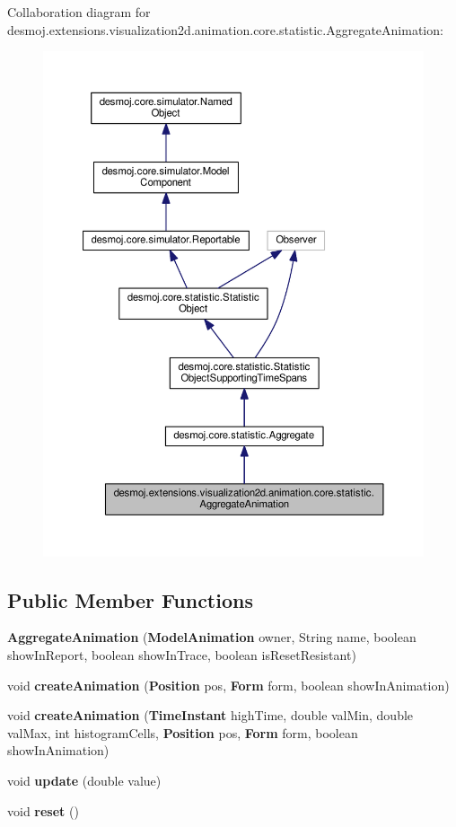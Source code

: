 Collaboration diagram for desmoj.\-extensions.\-visualization2d.\-animation.\-core.\-statistic.\-Aggregate\-Animation\-:
\nopagebreak
\begin{figure}[H]
\begin{center}
\leavevmode
\includegraphics[width=350pt]{classdesmoj_1_1extensions_1_1visualization2d_1_1animation_1_1core_1_1statistic_1_1_aggregate_animation__coll__graph}
\end{center}
\end{figure}
\subsection*{Public Member Functions}
\begin{DoxyCompactItemize}
\item 
{\bf Aggregate\-Animation} ({\bf Model\-Animation} owner, String name, boolean show\-In\-Report, boolean show\-In\-Trace, boolean is\-Reset\-Resistant)
\item 
void {\bf create\-Animation} ({\bf Position} pos, {\bf Form} form, boolean show\-In\-Animation)
\item 
void {\bf create\-Animation} ({\bf Time\-Instant} high\-Time, double val\-Min, double val\-Max, int histogram\-Cells, {\bf Position} pos, {\bf Form} form, boolean show\-In\-Animation)
\item 
void {\bf update} (double value)
\item 
void {\bfseries reset} ()\label{classdesmoj_1_1extensions_1_1visualization2d_1_1animation_1_1core_1_1statistic_1_1_aggregate_animation_a327b49ee4030314e48391dd65dc21f21}

\end{DoxyCompactItemize}
